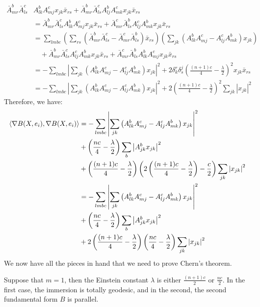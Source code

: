 \begin{align*}
\bar{A}^b_{mr} \bar{A}^c_{ls} & A^b_{lk} A^c_{mj} x_{jk} \bar{x}_{rs} + \bar{A}^b_{mr} \bar{A}^c_{ls} A^b_{lj} A^c_{mk} x_{jk} \bar{x}_{rs} \\ 
&= \bar{A}^b_{mr} \bar{A}^c_{ls} A^b_{lk} A^c_{mj} x_{jk} \bar{x}_{rs} + \bar{A}^c_{mr} \bar{A}^b_{ls} A^c_{lj} A^b_{mk} x_{jk} \bar{x}_{rs} \\
&=  \sum_{lmbc} \left( \sum_{rs} ( \bar{A}^b_{mr} \bar{A}^c_{ls} - \bar{A}^c_{mr} \bar{A}^b_{ls} ) \bar{x}_{rs} \right) \left( \sum_{jk} ( A^b_{lk} A^c_{mj} -  A^c_{lj} A^b_{mk} ) x_{jk} \right)\\
&\quad +  \bar{A}^b_{mr} \bar{A}^c_{ls} A^c_{lj} A^b_{mk} x_{jk} \bar{x}_{rs} + \bar{A}^c_{mr} \bar{A}^b_{ls} A^b_{lk} A^c_{mj} x_{jk} \bar{x}_{rs} \\
&= - \sum_{lmbc} \left| \sum_{jk} \left( A^b_{lk} A^c_{mj} -  A^c_{lj} A^b_{mk}  \right) x_{jk} \right|^2 + 2 \delta^r_k \delta^j_s \left( \frac{(n+1)c}{4} - \frac{\lambda}{2} \right)^2 x_{jk} \bar{x}_{rs} \\
&= - \sum_{lmbc} \left| \sum_{jk} \left( A^b_{lk} A^c_{mj} -  A^c_{lj} A^b_{mk} \right) x_{jk} \right|^2 + 2 \left( \frac{(n+1)c}{4} - \frac{\lambda}{2} \right)^2 \sum_{jk} \left| x_{jk} \right|^2
\end{align*}
%
Therefore, we have:
%
\begin{align*}
\left\langle \nabla B (X, e_i), \nabla B(X, e_i) \right\rangle &= - \sum_{lmbc} \left| \sum_{jk} \left( A^b_{lk} A^c_{mj} -  A^c_{lj} A^b_{mk} \right) x_{jk} \right|^2 \\
&+ \left( \frac{nc}{4} - \frac{\lambda}{2} \right) \sum_{b} \left| A^b_{jk} x_{jk} \right|^2 \\
&+ \left( \frac{(n+1)c}{4} - \frac{\lambda}{2} \right) \left( 2 \left( \frac{(n+1)c}{4} - \frac{\lambda}{2} \right) - \frac{c}{2} \right) \sum_{jk} \left| x_{jk} \right|^2 \\
&=  - \sum_{lmbc} \left| \sum_{jk} \left( A^b_{lk} A^c_{mj} -  A^c_{lj} A^b_{mk} \right) x_{jk} \right|^2 \\
&+ \left( \frac{nc}{4} - \frac{\lambda}{2} \right) \sum_{b} \left| A^b_{jk} x_{jk} \right|^2 \\
&+ 2 \left( \frac{(n+1)c}{4} - \frac{\lambda}{2} \right) \left( \frac{nc}{4} - \frac{\lambda}{2} \right) \sum_{jk} \left| x_{jk} \right|^2
\end{align*}
%
We now have all the pieces in hand that we need to prove Chern's theorem.

\begin{thm} 
Suppose that $m=1$, then the Einstein constant $\lambda$ is either $\frac{(n+1)c}{2}$ or $\frac{nc}{2}$.  In the first case, the immersion is totally geodesic, and in the second, the second fundamental form $B$ is parallel. 
\end{thm}

